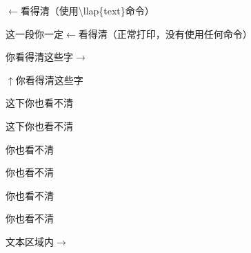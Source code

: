 ﻿\documentclass{article}
\begin{document}
    \hspace{6em}$\leftarrow$\mbox{看得清（使用\textbackslash llap\{text\}\mbox{命令}}）

    这一段你一定\mbox{$\leftarrow$\mbox{看得清（正常打印，没有使用任何命令）}}

\hrulefill

    \mbox{你看得清这些字}$\rightarrow$

    $\uparrow$\mbox{你看得清这些字}

    这下你也看不清

    这下你也看不清

    \indent{}你也看不清

    \noindent{}你也看不清

    \hspace{5em}你也看不清

    \hspace{-5em}你也看不清

    \hfill \mbox{文本区域内}$\rightarrow$
\end{document}
